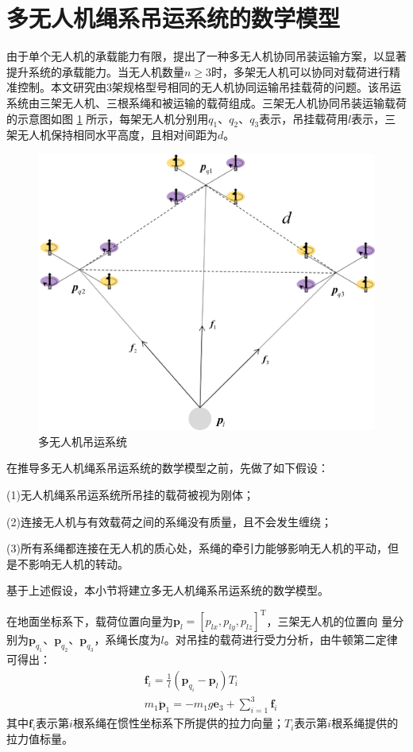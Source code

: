 \documentclass[lang=chs, degree=master, blindreview=false, winfonts=true]{yanputhesis}
\begin{document}
\section{多无人机绳系吊运系统的数学模型}
由于单个无人机的承载能力有限，提出了一种多无人机协同吊装运输方案，以显著提升系统的承载能力。当无人机数量$n\geq3$时，多架无人机可以协同对载荷进行精准控制\cite{fink2011planning}。本文研究由3架规格型号相同的无人机协同运输吊挂载荷的问题。该吊运系统由三架无人机、三根系绳和被运输的载荷组成。三架无人机协同吊装运输载荷的示意图如图 \ref{2_3} 所示，每架无人机分别用$q_1$、$q_2$、$q_3$表示，吊挂载荷用$l$表示，三架无人机保持相同水平高度，且相对间距为$d$。
\begin{figure}[hbt!]
	\centering
	\includegraphics[width=28pc]{picture/2_3.png} 
	\caption{多无人机吊运系统} \label{2_3}
\end{figure}
在推导多无人机绳系吊运系统的数学模型之前，先做了如下假设：

(1)无人机绳系吊运系统所吊挂的载荷被视为刚体； 

(2)连接无人机与有效载荷之间的系绳没有质量，且不会发生缠绕；

(3)所有系绳都连接在无人机的质心处，系绳的牵引力能够影响无人机的平动，但是不影响无人机的转动。 

基于上述假设，本小节将建立多无人机绳系吊运系统的数学模型。


在地面坐标系下，载荷位置向量为$\bm p_{l}=[p_{lx},p_{ly},p_{lz}]^{\mathrm{T}}$，三架无人机的位置向
量分别为$\bm p_{q_1}$、$\bm p_{q_2}$、$\bm p_{q_3}$，系绳长度为$l$。对吊挂的载荷进行受力分析，由牛顿第二定律可得出：
\begin{equation}
	\label{2-15}
	\begin{aligned}
		&\bm f_{i}=\frac{1}{l}(\bm p_{q_i}-\bm p_{l})T_{i} \\
		&m_{1}\ddot{\bm p}_{1}=-m_{1}g\bm e_{3}+\sum_{i=1}^{3}\bm f_{i}
	\end{aligned}
\end{equation}
其中$\bm f_{i}$表示第$i$根系绳在惯性坐标系下所提供的拉力向量；$T_{i}$表示第$i$根系绳提供的拉力值标量。
\end{document}
